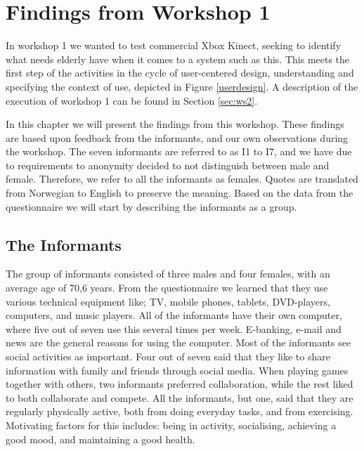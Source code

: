 \chapter{Findings from Workshop 1}
\label{chap:findW1}

In workshop 1 we wanted to test commercial Xbox Kinect, seeking to identify what needs elderly have when it comes to a system such as this. This meets the first step of the activities in the cycle of user-centered design, understanding and specifying the context of use, depicted in Figure \ref{userdesign}. A description of the execution of workshop 1 can be found in Section \ref{sec:ws2}. 

In this chapter we will present the findings from this workshop. These findings are based upon feedback from the informants, and our own observations during the workshop. The seven informants are referred to as I1 to I7, and we have due to requirements to anonymity decided to not distinguish between male and female. Therefore, we refer to all the informants as females. Quotes are translated from Norwegian to English to  preserve the meaning. Based on the data from the questionnaire we will start by describing the informants as a group.

\section{The Informants}
The group of informants consisted of three males and four females, with an average age of 70,6 years. From the questionnaire we learned that they use various technical equipment like; TV, mobile phones, tablets, DVD-players, computers, and music players. All of the informants have their own computer, where five out of seven use this several times per week. E-banking, e-mail and news are the general reasons for using the computer. Most of the informants see social activities as important. Four out of seven said that they like to share information with family and friends through social media. When playing games together with others, two informants preferred collaboration, while the rest liked to both collaborate and compete. All the informants, but one, said that they are regularly physically active, both from doing everyday tasks, and from exercising. Motivating factors for this includes: being in activity, socialising, achieving a good mood, and maintaining a good health.

